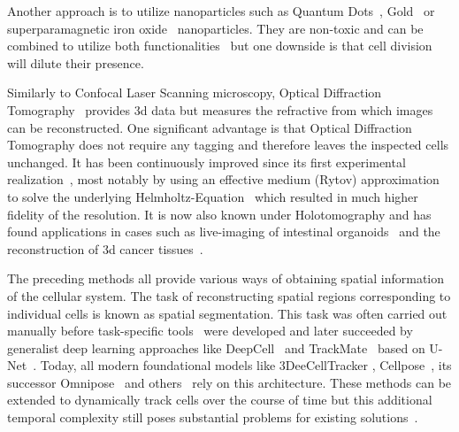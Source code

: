 Another approach is to utilize nanoparticles such as Quantum Dots~\cite{Chan1998},
Gold~\cite{Huang2007} or superparamagnetic iron oxide~\cite{Pankhurst2003} nanoparticles.
They are non-toxic and can be combined to utilize both functionalities~\cite{Fan2010} but one
downside is that cell division will dilute their presence.

Similarly to Confocal Laser Scanning microscopy, Optical Diffraction Tomography~\cite{Wolf1969}
provides \ac{3d} data but measures the refractive from which images can be reconstructed.
One significant advantage is that Optical Diffraction Tomography does not require any tagging and
therefore leaves the inspected cells unchanged.
It has been continuously improved since its first experimental realization~\cite{Fercher1979}, most
notably by using an effective medium (Rytov) approximation~\cite{Sung2009} to solve the underlying
Helmholtz-Equation~\cite{Helmholtz1860} which resulted in much higher fidelity of the resolution.
It is now also known under Holotomography and has found applications in cases such as live-imaging
of intestinal organoids~\cite{Lee2024} and the reconstruction of \ac{3d} cancer
tissues~\cite{Park2025}.

The preceding methods all provide various ways of obtaining spatial information of the cellular
system.
The task of reconstructing spatial regions corresponding to individual cells is known as spatial
segmentation.
This task was often carried out manually before task-specific tools~\cite{Carpenter2006} were
developed and later succeeded by generalist deep learning approaches like
DeepCell~\cite{VanValen2016} and TrackMate~\cite{Tinevez2017} based on U-Net~\cite{Ronneberger2015}.
Today, all modern foundational models like 3DeeCellTracker \cite{Wen2021},
Cellpose~\cite{Stringer2020}, its successor Omnipose~\cite{Cutler2022} and others~\cite{Hardo2022}
rely on this architecture.
These methods can be extended to dynamically track cells over the course of time but this additional
temporal complexity still poses substantial problems for existing
solutions~\cite{Maka2014,Maka2023,Ulman2017,Wen2021}.


